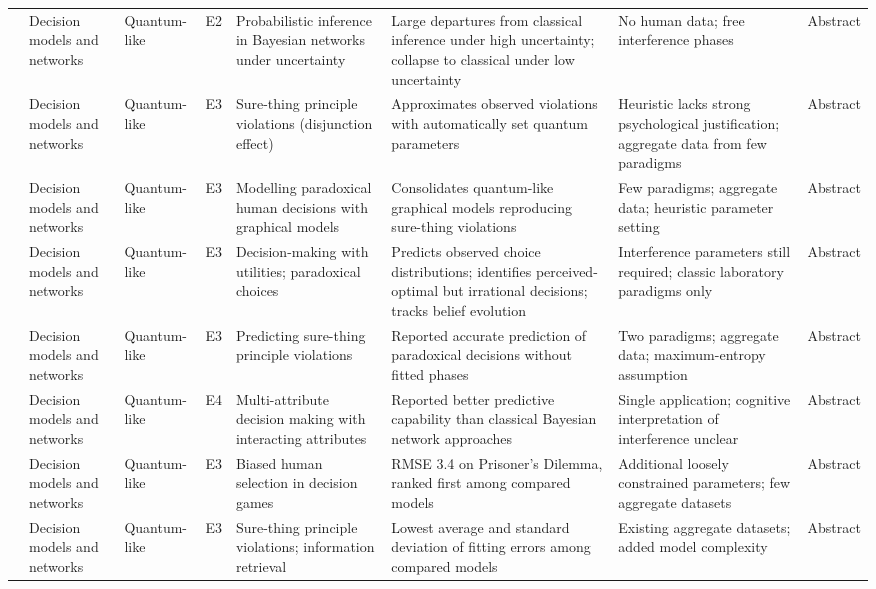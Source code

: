 \documentclass[10pt,a4paper]{article}
\begin{document}
\begin{landscape}
\begin{longtable}{@{}P{3.0cm}P{2.2cm}P{2.1cm}P{0.6cm}P{4.2cm}P{4.6cm}P{4.4cm}P{1.0cm}@{}}
\citet{Moreira2014} & Decision models and networks & Quantum-like & E2 & Probabilistic inference in Bayesian networks under uncertainty & Large departures from classical inference under high uncertainty; collapse to classical under low uncertainty & No human data; free interference phases & Abstract \\
\citet{Moreira2016} & Decision models and networks & Quantum-like & E3 & Sure-thing principle violations (disjunction effect) & Approximates observed violations with automatically set quantum parameters & Heuristic lacks strong psychological justification; aggregate data from few paradigms & Abstract \\
\citet{Moreira2017a} & Decision models and networks & Quantum-like & E3 & Modelling paradoxical human decisions with graphical models & Consolidates quantum-like graphical models reproducing sure-thing violations & Few paradigms; aggregate data; heuristic parameter setting & Abstract \\
\citet{Moreira2020b} & Decision models and networks & Quantum-like & E3 & Decision-making with utilities; paradoxical choices & Predicts observed choice distributions; identifies perceived-optimal but irrational decisions; tracks belief evolution & Interference parameters still required; classic laboratory paradigms only & Abstract \\
\citet{Wichert2020} & Decision models and networks & Quantum-like & E3 & Predicting sure-thing principle violations & Reported accurate prediction of paradoxical decisions without fitted phases & Two paradigms; aggregate data; maximum-entropy assumption & Abstract \\
\citet{She2021} & Decision models and networks & Quantum-like & E4 & Multi-attribute decision making with interacting attributes & Reported better predictive capability than classical Bayesian network approaches & Single application; cognitive interpretation of interference unclear & Abstract \\
\citet{Meghdadi2022} & Decision models and networks & Quantum-like & E3 & Biased human selection in decision games & RMSE 3.4 on Prisoner's Dilemma, ranked first among compared models & Additional loosely constrained parameters; few aggregate datasets & Abstract \\
\citet{Gao2025} & Decision models and networks & Quantum-like & E3 & Sure-thing principle violations; information retrieval & Lowest average and standard deviation of fitting errors among compared models & Existing aggregate datasets; added model complexity & Abstract \\

\end{longtable}
\end{landscape}
\end{document}
